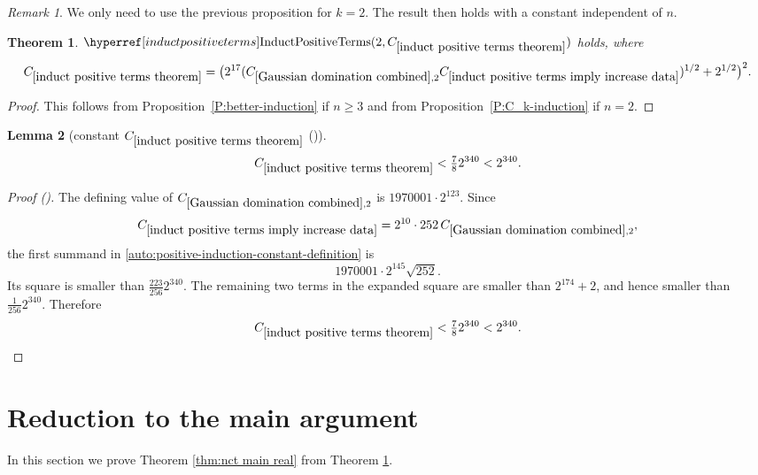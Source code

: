 \documentclass[12pt,reqno]{amsart}
\newcommand{\auto}{{({\tiny\faCar})}}
\theoremstyle{plain}
\newtheorem{theorem}{Theorem}[section]
\newtheorem{lemma}[theorem]{Lemma}
\numberwithin{equation}{section}
\theoremstyle{remark}
\newtheorem{rem}{Remark}[section]
\newcommand{\using}[1]{}
\begin{document}
\begin{rem}
We only need to use the previous proposition for $k=2$. The result then holds with a constant independent of $n$.
\end{rem}

\begin{theorem}\label{induct positive terms theorem}\using{P:better-induction}\using{P:C_k-induction}
$\InductPositiveTerms{2,C_{\ref{induct positive terms theorem}}}$ holds, where
\begin{equation}\label{auto:positive-induction-constant-definition}
C_{\ref{induct positive terms theorem}}
=
\bigl(2^{17}(C_{\ref{Gaussian domination combined},2}C_{\ref{induct positive terms imply increase data}})^{1/2}+2^{1/2}\bigr)^2.
\end{equation}
\end{theorem}

\begin{proof}
This follows from Proposition~\ref{P:better-induction} if $n\ge 3$ and from Proposition~\ref{P:C_k-induction} if $n=2$.
\end{proof}

\begin{lemma}[constant $C_{\ref{induct positive terms theorem}}$ \auto]\label{constant induct positive terms theorem}\using{induct positive terms imply increase data}\using{Gaussian domination combined}\using{induct positive terms theorem}
\begin{equation}\label{constant induct positive terms theorem bound}
C_{\ref{induct positive terms theorem}}<\tfrac78 2^{340}<2^{340}.
\end{equation}
\end{lemma}
\begin{proof}[Proof \auto]
The defining value of $C_{\ref{Gaussian domination combined},2}$ is $1970001\cdot2^{123}$. Since
\[
C_{\ref{induct positive terms imply increase data}}
=2^{10}\cdot252\,C_{\ref{Gaussian domination combined},2},
\]
the first summand in \eqref{auto:positive-induction-constant-definition} is
\[
1970001\cdot2^{145}\sqrt{252}.
\]
Its square is smaller than $\frac{223}{256}2^{340}$. The remaining two terms in the expanded square are smaller than $2^{174}+2$, and hence smaller than $\frac1{256}2^{340}$. Therefore
\[
C_{\ref{induct positive terms theorem}}
<\tfrac78 2^{340}<2^{340}.
\]
\end{proof}


\section{Reduction to the main argument}\label{sec:reduction}
In this section we prove Theorem \ref{thm:nct main real} from Theorem \ref{induct positive terms theorem}.
\end{document}
